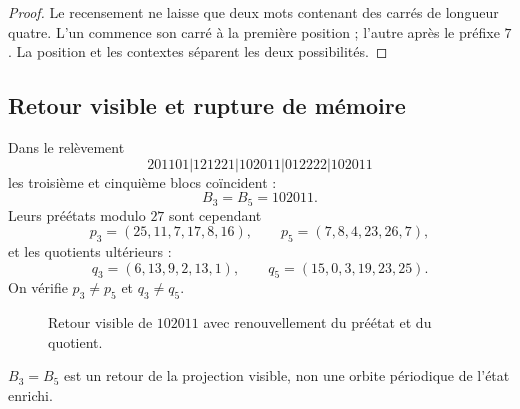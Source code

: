 \begin{proof}
Le recensement ne laisse que deux mots contenant des carrés de longueur quatre. L’un
commence son carré à la première position ; l’autre après le préfixe \(7\). La
position et les contextes séparent les deux possibilités.
\end{proof}

\subsection{Retour visible et rupture de mémoire}

Dans le relèvement
\[
 201101|121221|102011|012222|102011
\]
les troisième et cinquième blocs coïncident :
\[
 B_3=B_5=102011.
\]
Leurs préétats modulo \(27\) sont cependant
\[
 p_3=(25,11,7,17,8,16),
 \qquad
 p_5=(7,8,4,23,26,7),
\]
et les quotients ultérieurs :
\[
 q_3=(6,13,9,2,13,1),
 \qquad
 q_5=(15,0,3,19,23,25).
\]
On vérifie \(p_3\ne p_5\) et \(q_3\ne q_5\).

\begin{figure}[htbp]
\centering
{}
\caption{Retour visible de \(102011\) avec renouvellement du préétat et du
quotient.}
\label{p12-83-c9-s2:fig:ruptura-memoria-e}
\end{figure}

\begin{theorem}
\label{p12-83-c9-s2:thm:retorno-visible-no-periodico-e}
\(B_3=B_5\) est un retour de la projection visible, non une orbite périodique
de l’état enrichi.
\end{theorem}


